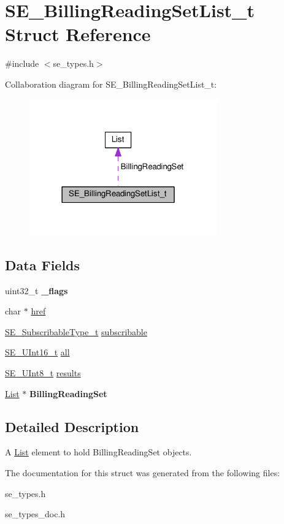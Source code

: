 \hypertarget{structSE__BillingReadingSetList__t}{}\section{S\+E\+\_\+\+Billing\+Reading\+Set\+List\+\_\+t Struct Reference}
\label{structSE__BillingReadingSetList__t}


{\ttfamily \#include $<$se\+\_\+types.\+h$>$}



Collaboration diagram for S\+E\+\_\+\+Billing\+Reading\+Set\+List\+\_\+t\+:\nopagebreak
\begin{figure}[H]
\begin{center}
\leavevmode
\includegraphics[width=230pt]{structSE__BillingReadingSetList__t__coll__graph}
\end{center}
\end{figure}
\subsection*{Data Fields}
\begin{DoxyCompactItemize}
\item 
uint32\+\_\+t {\bfseries \+\_\+flags}
\item 
char $\ast$ \hyperlink{group__BillingReadingSetList_ga517a08d060d1767f0171f645def9e00d}{href}
\item 
\hyperlink{group__SubscribableType_ga5c41f553d369710ed34619266bf2551e}{S\+E\+\_\+\+Subscribable\+Type\+\_\+t} \hyperlink{group__BillingReadingSetList_gaf43e69532d7afb41951cec8451b82e46}{subscribable}
\item 
\hyperlink{group__UInt16_gac68d541f189538bfd30cfaa712d20d29}{S\+E\+\_\+\+U\+Int16\+\_\+t} \hyperlink{group__BillingReadingSetList_ga9d555f915ee1b7c518fbe648a623ab55}{all}
\item 
\hyperlink{group__UInt8_gaf7c365a1acfe204e3a67c16ed44572f5}{S\+E\+\_\+\+U\+Int8\+\_\+t} \hyperlink{group__BillingReadingSetList_ga9e175aeff78de11da028b57ed27c610b}{results}
\item 
\hyperlink{structList}{List} $\ast$ {\bfseries Billing\+Reading\+Set}
\end{DoxyCompactItemize}


\subsection{Detailed Description}
A \hyperlink{structList}{List} element to hold Billing\+Reading\+Set objects. 

The documentation for this struct was generated from the following files\+:\begin{DoxyCompactItemize}
\item 
se\+\_\+types.\+h\item 
se\+\_\+types\+\_\+doc.\+h\end{DoxyCompactItemize}
